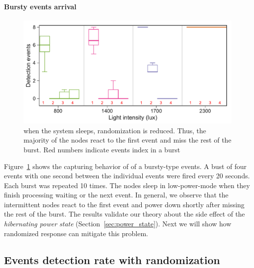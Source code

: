 \paragraph{Bursty events arrival}
\begin{figure}[t]
		\centering
		\includegraphics[width=\columnwidth]{figures/events_burst_problem.pdf}
		\caption{when the system sleeps, randomization is reduced. Thus, the majority of the nodes react to the first event and miss the rest of the burst. Red numbers indicate events index in a burst}
		\label{fig:events_burst_problem}
\end{figure} 
Figure~\ref{fig:events_burst_problem} shows the capturing behavior of \sys of a bursty-type events. A bust of four events with one second between the individual events were fired every 20 seconds. Each burst was repeated 10 times. The nodes sleep in low-power-mode when they finish processing waiting or the next event. In general, we observe that the intermittent nodes react to the first event and power down shortly after missing the rest of the burst. The results validate our theory about the side effect of the \textit{hibernating power state} (Section~\ref{sec:power_state}). Next we will show how randomized response can mitigate this problem. 


\subsection{Events detection rate with randomization}
\begin{figure}[t]
		\centering
		\caption{}
		\label{fig:solarPwrCoIS}
\end{figure} 


